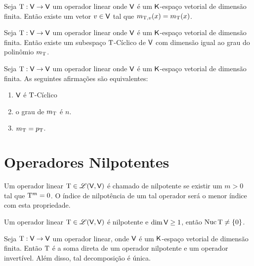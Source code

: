\documentclass[10pt,a4paper]{book}
\begin{document}
\begin{lemma}
	Seja $\mathrm{ T }: \mathsf{ V } \rightarrow \mathsf{ V }$ um operador linear onde $\mathsf{ V }$ é um $\mathsf{ K }$-espaço vetorial de dimensão finita. Então existe um vetor $v \in \mathsf{ V }$ tal que $m_{\mathrm{ T },v}(x) = m_{\mathrm{ T }}(x)$.
\end{lemma}

\begin{corollary}
	Seja $\mathrm{ T }: \mathsf{ V } \rightarrow \mathsf{ V }$ um operador linear onde $\mathsf{ V }$ é um $\mathsf{ K }$-espaço vetorial de dimensão finita. Então existe um subespaço $\mathrm{ T }$-Cíclico de $\mathsf{ V }$ com dimensão igual ao grau do polinômio $m_{\mathrm{ T }}$.
\end{corollary}

\begin{theorem}
	Seja $\mathrm{ T }: \mathsf{ V } \rightarrow \mathsf{ V }$ um operador linear onde $\mathsf{ V }$ é um $\mathsf{ K }$-espaço vetorial de dimensão finita. As seguintes afirmações são equivalentes:
	\begin{enumerate}
		\item $\mathsf{ V }$ é $\mathrm{ T }$-Cíclico 
		\item o grau de $m_{\mathrm{ T }}$ é $n$.
		\item $m_{\mathrm{ T }} = p_{\mathrm{ T }}$.
	\end{enumerate}
\end{theorem}




\section{Operadores Nilpotentes}

\begin{definition}
	Um operador linear $\mathrm{ T } \in \mathscr{ L }(\mathsf{ V }, \mathsf{ V })$ é chamado de nilpotente se existir um $m > 0$ tal que $\mathrm{ T } ^ m = 0$. O índice de nilpotência de um tal operador será o menor índice com esta propriedade.
\end{definition}

\begin{lemma}
	Um operador linear $\mathrm{ T } \in \mathscr{ L }(\mathsf{ V }, \mathsf{ V })$ é nilpotente e $\dim \mathsf{ V } \geq 1$, então $\mathrm{ Nuc }\, \mathrm{ T } \neq \{ 0 \}$.
\end{lemma}

\begin{theorem}
	Seja $\mathrm{ T } : \mathsf{ V } \rightarrow \mathsf{ V } $ um operador linear, onde $\mathsf{ V }$ é um $\mathsf{ K }$-espaço vetorial de dimensão finita. Então $\mathrm{ T }$ é a soma direta de um operador nilpotente e um operador invertível. Além disso, tal decomposição é única.
\end{theorem}
\end{document}
